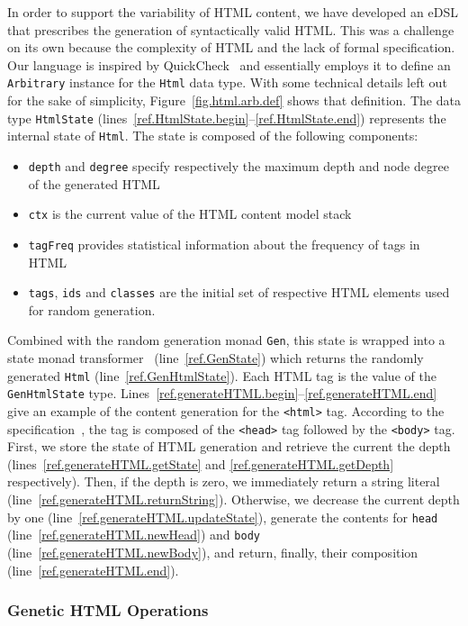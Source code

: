 In order to support the variability of HTML content, we have developed an eDSL that prescribes the generation of syntactically valid HTML. This was a challenge on its own because the complexity of HTML and the lack of formal specification. Our language is inspired by QuickCheck~\cite{claessen2011quickcheck} and essentially employs it to define an \texttt{Arbitrary} instance for the \texttt{Html} data type. With some technical details left out for the sake of simplicity, Figure~\ref{fig.html.arb.def} shows that definition. The data type \texttt{HtmlState} (lines~\ref{ref.HtmlState.begin}--\ref{ref.HtmlState.end}) represents the internal state of \texttt{Html}. The state is composed of the following components:
\begin{itemize}
\item \texttt{depth} and \texttt{degree} specify respectively the maximum depth and node degree of the generated HTML
\item \texttt{ctx} is the current value of the HTML content model stack
\item \texttt{tagFreq} provides statistical information about the frequency of tags in HTML
\item \texttt{tags}, \texttt{ids} and \texttt{classes} are the initial set of respective HTML elements used for random generation.
\end{itemize}
Combined with the random generation monad \texttt{Gen}, this state is wrapped into a state monad transformer~\cite{jones1995functional} (line~\ref{ref.GenState}) which returns the randomly generated \texttt{Html} (line~\ref{ref.GenHtmlState}). Each HTML tag is the value of the \texttt{GenHtmlState} type. Lines~\ref{ref.generateHTML.begin}--\ref{ref.generateHTML.end} give an example of the content generation for the \texttt{<html>} tag. According to the specification~\cite{htmlspec}, the tag is composed of the \texttt{<head>} tag followed by the \texttt{<body>} tag. First, we store the state of HTML generation and retrieve the current the depth (lines~\ref{ref.generateHTML.getState} and \ref{ref.generateHTML.getDepth} respectively). Then, if the depth is zero, we immediately return a string literal (line~\ref{ref.generateHTML.returnString}). Otherwise, we decrease the current depth by one (line~\ref{ref.generateHTML.updateState}), generate the contents for \texttt{head} (line~\ref{ref.generateHTML.newHead}) and \texttt{body} (line~\ref{ref.generateHTML.newBody}), and return, finally, their composition (line~\ref{ref.generateHTML.end}).

\subsubsection{Genetic HTML Operations}
\label{sub.sub.sec.genetic.oper}

